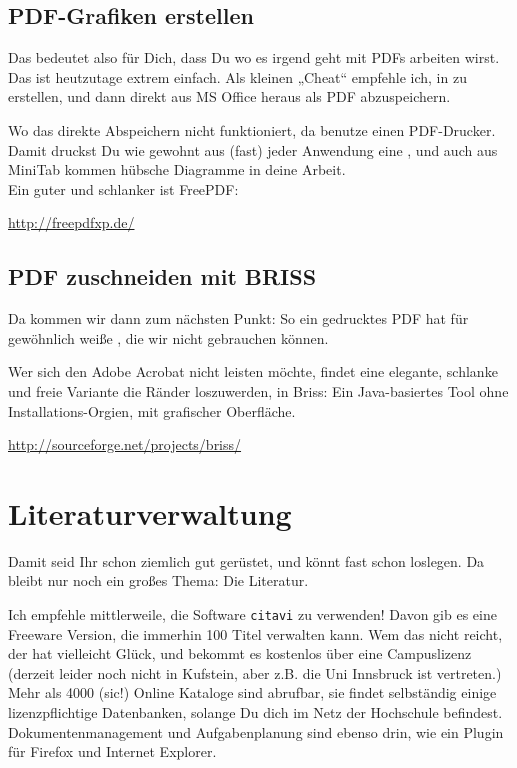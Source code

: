 \subsection*{PDF-Grafiken erstellen}
\label{PDF-Grafik}
Das bedeutet also für Dich, dass Du wo es irgend geht mit PDFs arbeiten wirst. Das ist heutzutage extrem einfach. Als kleinen „Cheat“ empfehle ich,  in  zu erstellen, und dann direkt aus MS Office heraus als PDF abzuspeichern. 

Wo das direkte Abspeichern nicht funktioniert, da benutze einen PDF-Drucker. Damit druckst Du wie gewohnt aus (fast) jeder Anwendung eine , und auch aus MiniTab kommen hübsche Diagramme in deine Arbeit. \\
Ein guter und schlanker  ist FreePDF:

\url{http://freepdfxp.de/}



\subsection*{PDF zuschneiden mit BRISS}
Da kommen wir dann zum nächsten Punkt: So ein gedrucktes PDF hat für gewöhnlich weiße , die wir nicht gebrauchen können. 

Wer sich den Adobe Acrobat nicht leisten möchte, findet eine elegante, schlanke und freie Variante die Ränder loszuwerden, in Briss: Ein Java-basiertes Tool ohne Installations-Orgien, mit grafischer Oberfläche.

\url{http://sourceforge.net/projects/briss/}

\section*{Literaturverwaltung} 
Damit seid Ihr schon ziemlich gut gerüstet, und könnt fast schon loslegen. Da bleibt nur noch ein großes Thema: Die Literatur.

Ich empfehle mittlerweile, die Software \verb|citavi| zu verwenden! Davon gib es eine Freeware Version, die immerhin 100 Titel verwalten kann. Wem das nicht reicht, der hat vielleicht Glück, und bekommt es kostenlos über eine Campuslizenz (derzeit leider noch nicht in Kufstein, aber z.B. die Uni Innsbruck ist vertreten.) \\
Mehr als 4000 (sic!) Online Kataloge sind abrufbar, sie findet selbständig einige lizenzpflichtige Datenbanken, solange Du dich im Netz der Hochschule befindest. Dokumentenmanagement und Aufgabenplanung sind ebenso drin, wie ein Plugin für Firefox und Internet Explorer.

